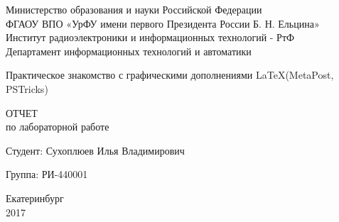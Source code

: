 \begin{titlepage}
  \begin{center}
    Министерство образования и науки Российской Федерации\\
    ФГАОУ ВПО  «УрФУ имени первого Президента России Б. Н. Ельцина»\\
    Институт радиоэлектроники и информационных технологий - РтФ\\
    Департамент информационных технологий и автоматики
    \par
    \vspace{5.5cm}
    \Large{
      Практическое знакомство с графическими дополнениями \LaTeX (MetaPost, PSTricks)
      
      \par
      \vspace{1cm}

      ОТЧЕТ\\
      по лабораторной работе
    }

    \vspace{5cm}
    {
      Студент: \hfill Сухоплюев Илья Владимирович
    }
    \par
    {
      Группа: \hfill РИ-440001
    }

    \par
    \vspace{4cm}
    Екатеринбург\\
    2017
  \end{center}
\end{titlepage}